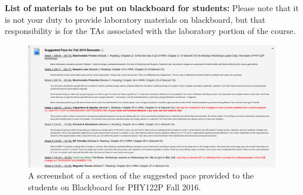 \documentclass[12pt]{article}
\begin{document}
\noindent \textbf{List of materials to be put on blackboard for students:} Please note that it is not your duty to provide laboratory materials on blackboard, but that responsibility is for the TAs associated with the laboratory portion of the course.

\begin{figure}[h]
  \centering
      \includegraphics[width=1\textwidth]{Figures/SuggestedPace.png}
  \caption{\protect\label{fig:suggpace} A screenshot of a section of the suggested pace provided to the students on Blackboard for PHY122P Fall 2016.}
\end{figure}
\end{document}
